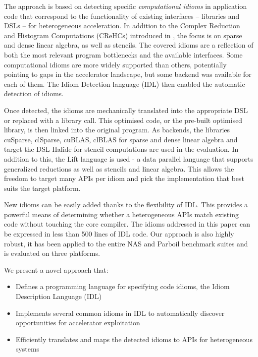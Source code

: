     The approach is based on detecting specific {\em computational idioms} in
    application code that correspond to the functionality of existing interfaces
    -- libraries and DSLs -- for heterogeneous acceleration.
    In addition to the Complex Reduction and Histogram Computations (CReHCs)
    introduced in , the focus is on
    sparse and dense linear algebra, as well as stencils.
    The covered idioms are a reflection of both the most relevant program
    bottlenecks and the available interfaces.
    Some computational idioms are more widely supported than others, potentially
    pointing to gaps in the accelerator landscape, but some backend was
    available for each of them.
    The Idiom Detection language (IDL) then enabled the automatic detection of
    idioms.

    Once detected, the idioms are mechanically translated into the appropriate
    DSL or replaced with a library call.
    This optimised code, or the pre-built optimised library, is then linked into
    the original program.
    As backends, the libraries cuSparse, clSparse, cuBLAS, clBLAS for
    sparse and dense linear algebra and target the DSL Halide
    \cite{Ragan-Kelley2013Halide} for stencil computations are used in the
    evaluation.
    In addition to this, the Lift language \cite{SteuwerRD17} is used - a data
    parallel language that supports generalized reductions as well as stencils
    and linear algebra.
    This allows the freedom to target many APIs per idiom and pick the
    implementation that best suits the target platform.

    New idioms can be easily added thanks to the flexibility of IDL.
    This provides a powerful means of determining whether a heterogeneous
    APIs match existing code without touching the core compiler.
    The idioms addressed in this paper can be expressed in less than 500 lines
    of IDL code.
    Our approach is also highly robust, it has been applied to the entire NAS
    and Parboil benchmark suites and is evaluated on three platforms.

    We present a novel approach that:
    \begin{itemize}
    \item Defines a programming language for specifying code idioms, the Idiom
          Description Language (IDL)
    \item Implements several common idioms in IDL to automatically discover
     opportunities for accelerator exploitation
    \item Efficiently translates and maps the detected idioms to APIs for
          heterogeneous systems
    \end{itemize}

